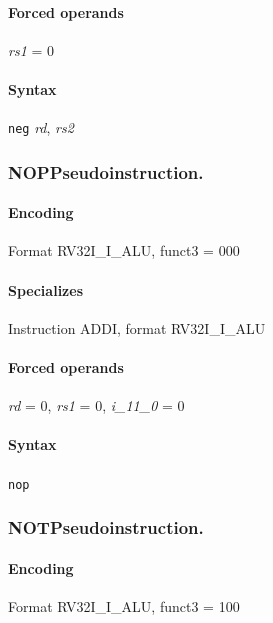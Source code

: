 {\paragraph{Forced operands} \emph{rs1} = 0

\paragraph{Syntax} \texttt{neg} \emph{rd}, \emph{rs2}
\newpage
\subsubsection[{\small NOP: Pseudoinstruction.}]{NOP\hfill Pseudoinstruction.}
\label{instr:NOP}

\paragraph{Encoding} Format \textsf{RV32I\_I\_ALU, funct3 = 000}\\



\paragraph{Specializes} Instruction ADDI, format RV32I\_I\_ALU

\paragraph{Forced operands} \emph{rd} = 0, \emph{rs1} = 0, \emph{i\_11\_0} = 0

\paragraph{Syntax} \texttt{nop}
\newpage
\subsubsection[{\small NOT: Pseudoinstruction.}]{NOT\hfill Pseudoinstruction.}
\label{instr:NOT}

\paragraph{Encoding} Format \textsf{RV32I\_I\_ALU, funct3 = 100}\\



}
